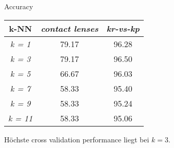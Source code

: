 
Accuracy

\begin{tabular}{c|c|c}
                k-NN       & \emph{contact lenses} & \emph{kr-vs-kp}  \\ \hline
				\emph{k = 1} & 79.17  & 96.28  \\ \hline
				\emph{k = 3} & 79.17  & 96.50  \\ \hline
				\emph{k = 5} & 66.67  & 96.03  \\ \hline
				\emph{k = 7} & 58.33  & 95.40  \\ \hline
				\emph{k = 9} & 58.33  & 95.24  \\ \hline
				\emph{k = 11} & 58.33  & 95.06  \\ \hline
\end{tabular}

Höchste cross validation performance liegt bei $k = 3$. 